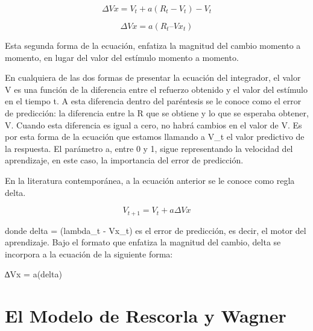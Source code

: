 \documentclass[
  letterpaper,
]{book}
\begin{document}
\[
\Delta Vx = V_t + a (R_t -V_t) - V_t
\]

\[
\Delta Vx = a(R_t – Vx_t)
\]

Esta segunda forma de la ecuación, enfatiza la magnitud del cambio
momento a momento, en lugar del valor del estímulo momento a momento.

En cualquiera de las dos formas de presentar la ecuación del integrador,
el valor V es una función de la diferencia entre el refuerzo obtenido y
el valor del estímulo en el tiempo t. A esta diferencia dentro del
paréntesis se le conoce como el error de predicción: la diferencia entre
la R que se obtiene y lo que se esperaba obtener, V. Cuando esta
diferencia es igual a cero, no habrá cambios en el valor de V. Es por
esta forma de la ecuación que estamos llamando a V\_t el valor
predictivo de la respuesta. El parámetro a, entre 0 y 1, sigue
representando la velocidad del aprendizaje, en este caso, la importancia
del error de predicción.

En la literatura contemporánea, a la ecuación anterior se le conoce como
regla delta.

\[
V_{t+1} = V_t + a \Delta Vx
\]

donde \(%
\)delta = (lambda\_t - Vx\_t)\(%
\) es el error de predicción, es decir, el motor del aprendizaje. Bajo
el formato que enfatiza la magnitud del cambio, delta se incorpora a la
ecuación de la siguiente forma:

\(%
\)∆Vx = a(delta)\(%
\)


\chapter{El Modelo de Rescorla y
Wagner}\label{el-modelo-de-rescorla-y-wagner}
\end{document}

